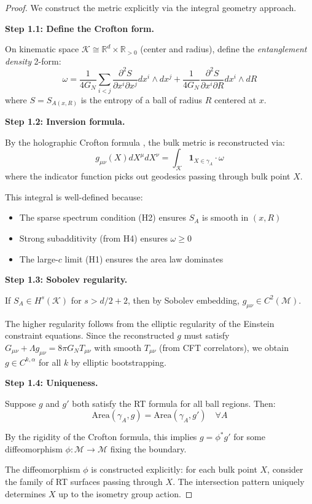 \documentclass[12pt,a4paper]{article}
\begin{document}
\begin{proof}
We construct the metric explicitly via the integral geometry approach.

\textbf{Step 1.1: Define the Crofton form.}

On kinematic space $\mathcal{K} \cong \mathbb{R}^d \times \mathbb{R}_{>0}$ (center and radius), define the \textit{entanglement density} 2-form:
\begin{equation}
\omega = \frac{1}{4G_N} \sum_{i<j} \frac{\partial^2 S}{\partial x^i \partial x^j} dx^i \wedge dx^j + \frac{1}{4G_N}\frac{\partial^2 S}{\partial x^i \partial R} dx^i \wedge dR
\end{equation}
where $S = S_{A(x,R)}$ is the entropy of a ball of radius $R$ centered at $x$.

\textbf{Step 1.2: Inversion formula.}

By the holographic Crofton formula \cite{czech2016}, the bulk metric is reconstructed via:
\begin{equation}
g_{\mu\nu}(X) dX^\mu dX^\nu = \int_{\mathcal{K}} \mathbf{1}_{X \in \gamma_A} \cdot \omega
\end{equation}
where the indicator function picks out geodesics passing through bulk point $X$.

This integral is well-defined because:
\begin{itemize}
    \item The sparse spectrum condition (H2) ensures $S_A$ is smooth in $(x, R)$
    \item Strong subadditivity (from H4) ensures $\omega \geq 0$
    \item The large-$c$ limit (H1) ensures the area law dominates
\end{itemize}

\textbf{Step 1.3: Sobolev regularity.}

If $S_A \in H^{s}(\mathcal{K})$ for $s > d/2 + 2$, then by Sobolev embedding, $g_{\mu\nu} \in C^{2}(\mathcal{M})$.

The higher regularity follows from the elliptic regularity of the Einstein constraint equations. Since the reconstructed $g$ must satisfy $G_{\mu\nu} + \Lambda g_{\mu\nu} = 8\pi G_N T_{\mu\nu}$ with smooth $T_{\mu\nu}$ (from CFT correlators), we obtain $g \in C^{k,\alpha}$ for all $k$ by elliptic bootstrapping.

\textbf{Step 1.4: Uniqueness.}

Suppose $g$ and $g'$ both satisfy the RT formula for all ball regions. Then:
\begin{equation}
\text{Area}(\gamma_A, g) = \text{Area}(\gamma_A, g') \quad \forall A
\end{equation}

By the rigidity of the Crofton formula, this implies $g = \phi^* g'$ for some diffeomorphism $\phi: \mathcal{M} \to \mathcal{M}$ fixing the boundary.

The diffeomorphism $\phi$ is constructed explicitly: for each bulk point $X$, consider the family of RT surfaces passing through $X$. The intersection pattern uniquely determines $X$ up to the isometry group action.
\end{proof}
\end{document}
